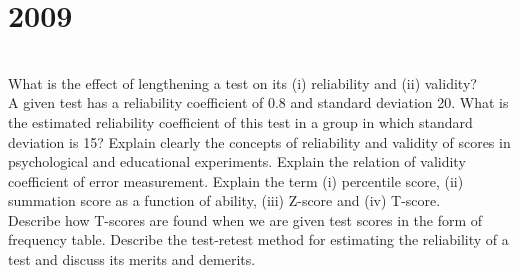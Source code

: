 \section*{2009}
\vspace{-.5cm}
\hrulefill \smallskip\\
 What is the effect of lengthening a test on its (i) reliability and (ii) validity?\\ A given test has a reliability coefficient of 0.8 and standard deviation 20. What is the estimated reliability coefficient of this test in a group in which standard deviation is 15?
\myline
{} Explain clearly the concepts of reliability and validity of scores in psychological and educational experiments. Explain the relation of validity coefficient of error measurement.
\myline
{} Explain the term (i) percentile score, (ii) summation score as a function of ability, (iii) Z-score and (iv) T-score.\\
Describe how T-scores are found when we are given test scores in the form of frequency table.
\myline
{} Describe the test-retest method for estimating the reliability of a test and discuss its merits and demerits.